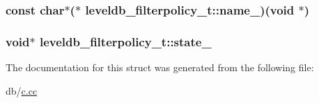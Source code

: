 \hypertarget{structleveldb__filterpolicy__t_a931dfc74b3cb6cb91c1aca19ac523661}{
\subsubsection[{name\-\_\-}]{\setlength{\rightskip}{0pt plus 5cm}const char$\ast$($\ast$ leveldb\-\_\-filterpolicy\-\_\-t\-::name\-\_\-)(void $\ast$)}}\label{structleveldb__filterpolicy__t_a931dfc74b3cb6cb91c1aca19ac523661}
\hypertarget{structleveldb__filterpolicy__t_a35aa5dd2f350f6eafa4ae904e55dcbe2}{
\subsubsection[{state\-\_\-}]{\setlength{\rightskip}{0pt plus 5cm}void$\ast$ leveldb\-\_\-filterpolicy\-\_\-t\-::state\-\_\-}}\label{structleveldb__filterpolicy__t_a35aa5dd2f350f6eafa4ae904e55dcbe2}


The documentation for this struct was generated from the following file\-:\begin{DoxyCompactItemize}
\item 
db/\hyperlink{c_8cc}{c.\-cc}\end{DoxyCompactItemize}
